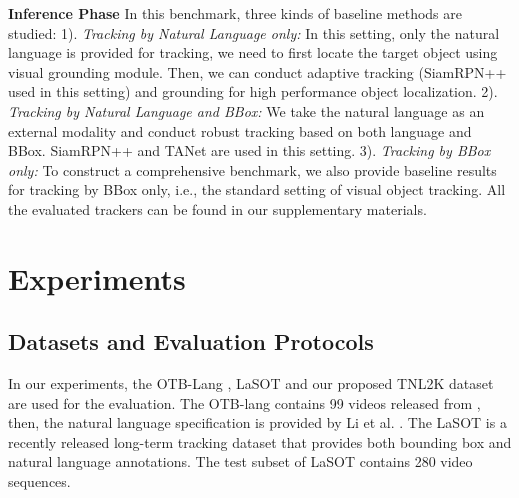 \documentclass[final]{cvpr}
\begin{document}
\textbf{Inference Phase} 
In this benchmark, three kinds of baseline methods are studied: 1). \emph{Tracking by Natural Language only:} In this setting, only the natural language is provided for tracking, we need to first locate the target object using visual grounding module. Then, we can conduct adaptive tracking (SiamRPN++ \cite{li2018siamrpn++} used in this setting) and grounding for high performance object localization. 2). \emph{Tracking by Natural Language and BBox:} We take the natural language as an external modality and conduct robust tracking based on both language and BBox. SiamRPN++ \cite{li2018siamrpn++} and TANet \cite{wang2019GANTrack} are used in this setting. 3). \emph{Tracking by BBox only:} To construct a comprehensive benchmark, we also provide baseline results for tracking by BBox only, i.e., the standard setting of visual object tracking. All the evaluated trackers can be found in our supplementary materials. 




































\section{Experiments}

\subsection{Datasets and Evaluation Protocols} 
In our experiments, the OTB-Lang \cite{wu2015object, li2017tracking}, LaSOT \cite{fan2019lasot} and our proposed TNL2K dataset are used for the evaluation. The OTB-lang contains 99 videos released from \cite{wu2015object}, then, the natural language specification is provided by Li et al. \cite{li2017tracking}. The LaSOT is a recently released long-term tracking dataset that provides both bounding box and natural language annotations. The test subset of LaSOT contains 280 video sequences. 
\end{document}
